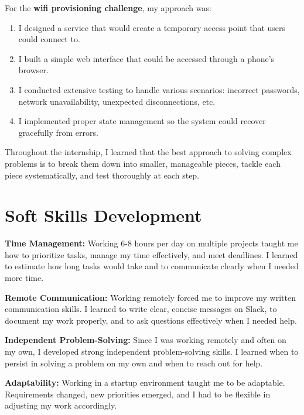 \documentclass[12pt,a4paper]{report}
\begin{document}
For the \textbf{wifi provisioning challenge}, my approach was:

\begin{enumerate}[itemsep=0.2cm]
    \item I designed a service that would create a temporary access point that users could connect to.
    \item I built a simple web interface that could be accessed through a phone's browser.
    \item I conducted extensive testing to handle various scenarios: incorrect passwords, network unavailability, unexpected disconnections, etc.
    \item I implemented proper state management so the system could recover gracefully from errors.
\end{enumerate}

\vspace{0.3cm}

Throughout the internship, I learned that the best approach to solving complex problems is to break them down into smaller, manageable pieces, tackle each piece systematically, and test thoroughly at each step.

\section{Soft Skills Development}

\textbf{Time Management:} Working 6-8 hours per day on multiple projects taught me how to prioritize tasks, manage my time effectively, and meet deadlines. I learned to estimate how long tasks would take and to communicate clearly when I needed more time.

\vspace{0.3cm}

\textbf{Remote Communication:} Working remotely forced me to improve my written communication skills. I learned to write clear, concise messages on Slack, to document my work properly, and to ask questions effectively when I needed help.

\vspace{0.3cm}

\textbf{Independent Problem-Solving:} Since I was working remotely and often on my own, I developed strong independent problem-solving skills. I learned when to persist in solving a problem on my own and when to reach out for help.

\vspace{0.3cm}

\textbf{Adaptability:} Working in a startup environment taught me to be adaptable. Requirements changed, new priorities emerged, and I had to be flexible in adjusting my work accordingly.
\end{document}
